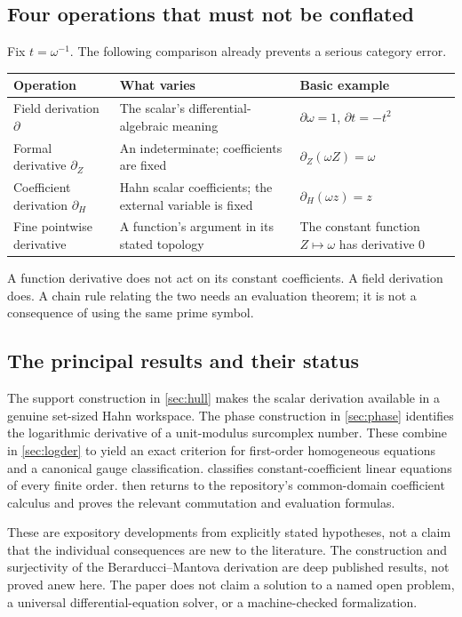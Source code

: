 \documentclass[11pt,a4paper]{article}
\theoremstyle{definition}
\newcommand{\D}{\partial}
\numberwithin{equation}{section}
\begin{document}
\subsection{Four operations that must not be conflated}
Fix $t=\omega^{-1}$. The following comparison already prevents a serious
category error.
\begin{center}
\begin{tabular}{L{0.25\textwidth}L{0.39\textwidth}L{0.25\textwidth}}
\toprule
Operation & What varies & Basic example\\
\midrule
Field derivation $\D$ & The scalar's differential-algebraic meaning &
$\D\omega=1$, $\D t=-t^2$\\
Formal derivative $\partial_Z$ & An indeterminate; coefficients are fixed &
$\partial_Z(\omega Z)=\omega$\\
Coefficient derivation $\D_H$ & Hahn scalar coefficients; the external variable is fixed &
$\D_H(\omega z)=z$\\
Fine pointwise derivative & A function's argument in its stated topology &
The constant function $Z\mapsto\omega$ has derivative $0$\\
\bottomrule
\end{tabular}
\end{center}
A function derivative does not act on its constant coefficients. A field
derivation does. A chain rule relating the two needs an evaluation theorem;
it is not a consequence of using the same prime symbol.

\subsection{The principal results and their status}
The support construction in \cref{sec:hull} makes the scalar derivation
available in a genuine set-sized Hahn workspace. The phase construction in
\cref{sec:phase} identifies the logarithmic derivative of a unit-modulus
surcomplex number. These combine in \cref{sec:logder} to yield an exact
criterion for first-order homogeneous equations and a canonical gauge
classification.  classifies constant-coefficient linear
equations of every finite order.  then returns to the
repository's common-domain coefficient calculus and proves the relevant
commutation and evaluation formulas.

These are expository developments from explicitly stated hypotheses, not a
claim that the individual consequences are new to the literature. The
construction and surjectivity of the Berarducci--Mantova derivation are deep
published results, not proved anew here. The paper does not claim a solution
to a named open problem, a universal differential-equation solver, or a
machine-checked formalization.
\end{document}
